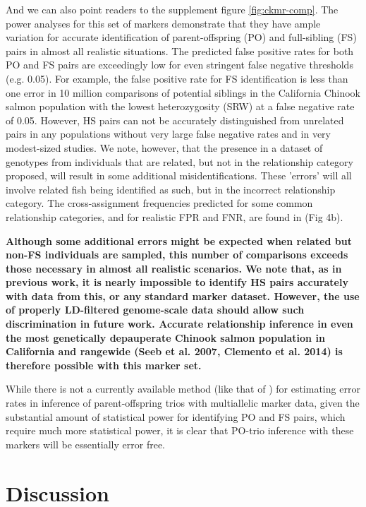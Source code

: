 And we can also point readers to the supplement figure \ref{fig:ckmr-comp}.
The power analyses for this set of markers demonstrate that they have ample variation
for accurate identification of parent-offspring (PO) and full-sibling (FS) pairs in almost all
realistic situations. The predicted false positive rates for both PO and FS pairs are
exceedingly low for even stringent false negative thresholds (e.g. 0.05). 
For example, the false positive rate for FS identification is less than one error in 10 million
comparisons of potential siblings in the California Chinook salmon population with the lowest
heterozygosity (SRW) at a false negative rate of 0.05. However, HS pairs can not be accurately
distinguished from unrelated pairs in any populations without very large false negative rates
and in very modest-sized studies.
We note, however, that the presence in a dataset of genotypes from individuals that are related, but not in
 the relationship category proposed, will result in some additional misidentifications.
 These 'errors' will all involve related fish being identified as such, but in the incorrect relationship category.  The cross-assignment frequencies predicted for some common relationship categories, and for realistic FPR and FNR, are found in (Fig 4b).


 
\textbf{Although some additional errors might be
expected when related but non-FS individuals are sampled,  this number of comparisons exceeds
those necessary in almost all realistic scenarios.
We note that, as in previous work, it is nearly impossible to identify HS pairs accurately
with data from this, or any standard marker dataset. However, the use of properly LD-filtered
genome-scale data should allow such discrimination in future work.
Accurate relationship
inference in even the most genetically depauperate Chinook salmon population in California
and rangewide (Seeb et al. 2007, Clemento et al. 2014) is therefore possible with this marker set.}


While there is not a currently available method (like that of \citeauthor{anderson2006power}) for estimating error rates in
inference of parent-offspring trios with multiallelic marker data, given the substantial amount of statistical power for identifying PO and FS pairs, which require much more statistical power, it is clear that PO-trio inference with these markers will be essentially error free.



\section*{Discussion}

